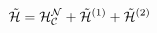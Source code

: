\begin{equation}
  {\tilde{\cal{H}}}={\cal{H}^N_C} + {\tilde{\cal{H}}^{(1)}} +{\tilde{\cal{H}}^{(2)}}
  \label{a66}
  \end{equation}

